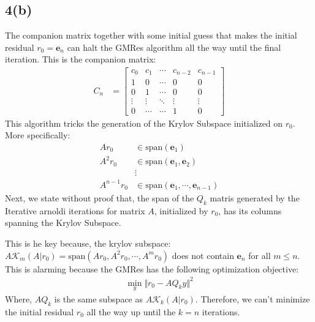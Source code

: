 \documentclass[]{article}
\begin{document}
    \subsection*{4(b)}
        The companion matrix together with some initial guess that makes the initial residual $r_0 = \mathbf{e}_n$ can halt the GMRes algorithm all the way until the final iteration. This is the companion matrix: 
        \begin{align*}\tag{4.b.1}\label{eqn:4.b.1}
            C_n &= 
            \begin{bmatrix}
                c_0 & c_1 & \cdots & c_{n - 2} & c_{n - 1}
                \\
                1 & 0 & \cdots & 0 & 0
                \\
                0 & 1 & \cdots & 0 & 0
                \\
                \vdots &\vdots &\ddots  & \vdots&\vdots 
                \\
                0 & \cdots & \cdots & 1 & 0
            \end{bmatrix}
        \end{align*}
        This algorithm tricks the generation of the Krylov Subspace initialized on $r_0$. More specifically: 
        \begin{align*}\tag{4.b.2}\label{eqn:4.b.2}
            Ar_0 &\in \text{span}(\mathbf{e}_1)
            \\
            A^2r_0 & \in \text{span}(\mathbf{e}_1, \mathbf{e}_2)
            \\
            & \vdots 
            \\
            A^{n - 1} r_0 &\in \text{span}(\mathbf{e}_1, \cdots, \mathbf{e}_{n - 1})
        \end{align*}
        Next, we state without proof that, the span of the $Q_k$ matris generated by the Iterative arnoldi iterations for matrix $A$, initialized by $r_0$, has its columns spanning the Krylov Subspace. 
        \par
        This is he key because, the krylov subspace: $A\mathcal{K}_m(A|r_0) = \text{span}(Ar_0, A^2r_0, \cdots, A^{m}r_0)$ does not contain $\mathbf{e}_n$ for all $m \le n$. This is alarming because the GMRes has the following optimization objective: 
        \begin{align*}\tag{4.b.3}\label{eqn:4.b.3}
            \min_{y} \Vert r_0 - AQ_k y\Vert^2
        \end{align*}
        Where, $AQ_k$ is the same subspace as $A\mathcal{K}_k(A|r_0)$. Therefore, we can't minimize the initial residual $r_0$ all the way up until the $k = n$ iterations. 
\end{document}
